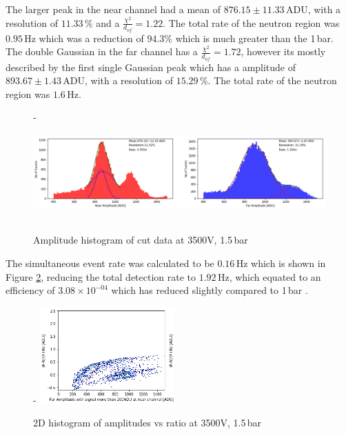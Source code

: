 \documentclass[a4paper]{article}
\begin{document}
\newline The larger peak in the near channel had a mean of $876.15 \pm 11.33$\,ADU, with a resolution of $11.33$\,\% and a $\frac{\chi^2}{d_{of}} = 1.22$. The total rate of the neutron region was $0.95$\,Hz which was a reduction of 94.3\% which is much greater than the 1\,bar. 
\newline The double Gaussian in the far channel has a $\frac{\chi^2}{d_{of}} = 1.72$, however its mostly described by the first single Gaussian peak which has a amplitude of $893.67 \pm 1.43$\,ADU, with a resolution of $15.29$\,\%. The total rate of the neutron region was $1.6$\,Hz.
\begin{figure}[H]-
    \centering
    \includegraphics[height=3.7cm]{plots/uk24n002_amp2.png}
    \caption{Amplitude histogram of cut data at 3500V, 1.5\,bar}
    \label{fig:2amp}
\end{figure}
\noindent The simultaneous event rate was calculated to be $0.16$\,Hz which is shown in Figure \ref{fig:2sym}, reducing the total detection rate to $1.92$\,Hz, which equated to an efficiency of $3.08\times 10^{-04}$ which has reduced slightly compared to 1\,bar .
\begin{figure}[H]-
    \centering
    \includegraphics[height=3.7cm]{plots/uk24n002_symcutgood1.png}
    \caption{2D histogram of amplitudes vs ratio at 3500V, 1.5\,bar}
    \label{fig:2sym}
\end{figure}
\end{document}
